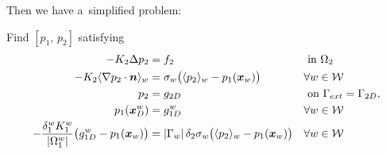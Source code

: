 Then we have a~simplified problem:
\begin{thmproblem} \label{thm:prim_simple_problem}
Find $[p_1,\,p_2]$ satisfying
\begin{align}
-K_2 \Delta p_2 &= f_2 && \textrm{ in } \Omega_2 \label{eqn:prim_simple_poisson}\\
-K_2\langle\nabla p_2 \cdot \mathbf{\boldsymbol{n}}\rangle_w &= \sigma_w\big( \langle p_2\rangle_w - p_1(\mathbf{\boldsymbol{x}}_w)\big)
    && \forall w\in\mathcal{W} \label{eqn:prim_simple_well_edge_bc} \\
p_2 &= g_{2D} && \textrm{ on } \Gamma_{ext} = \Gamma_{2D}, \label{eqn:prim_simple_dirichlet} \\
p_1(\mathbf{\boldsymbol{x}}^w_D) &= g^w_{1D} && \forall w\in\mathcal{W} \label{eqn:prim_simple_well_top_bc} \\
-\frac{\delta^w_1 K^w_1}{\left|\Omega^w_1\right|} \big(g^w_{1D} - p_1(\mathbf{\boldsymbol{x}}_w)\big) &=  \left|\Gamma_w\right| \delta_2 \sigma_w\big( \langle p_2\rangle_w - p_1(\mathbf{\boldsymbol{x}}_w)\big) 
    && \forall w\in\mathcal{W}\label{eqn:prim_simple_well_flow}
\end{align}
%
%
% 
\end{thmproblem}

